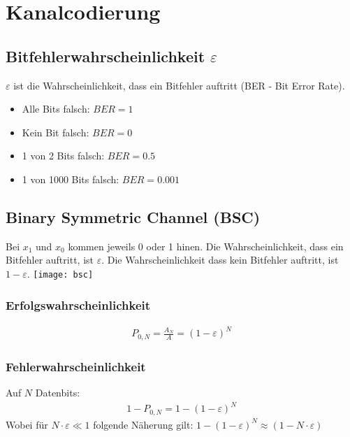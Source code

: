 \section{Kanalcodierung}
\subsection{Bitfehlerwahrscheinlichkeit $\varepsilon$}
$\varepsilon$ ist die Wahrscheinlichkeit, dass ein Bitfehler auftritt (BER - Bit Error Rate).
\begin{itemize}
	\item Alle Bits falsch: $BER = 1$
	\item Kein Bit falsch: $BER = 0$
	\item 1 von 2 Bits falsch: $BER = 0.5$
	\item 1 von 1000 Bits falsch: $BER = 0.001$
\end{itemize}
\subsection{Binary Symmetric Channel (BSC)}
Bei $x_1$ und $x_0$ kommen jeweils 0 oder 1 hinen. Die Wahrscheinlichkeit, dass ein Bitfehler auftritt, ist $\varepsilon$.
Die Wahrscheinlichkeit dass kein Bitfehler auftritt, ist $1 - \varepsilon$.
\texttt{[image: bsc]}
\subsubsection{Erfolgswahrscheinlichkeit}
\begin{align*}
	P_{0,N} = \frac{A_N}{A} = (1 - \varepsilon)^N
\end{align*}
\subsubsection{Fehlerwahrscheinlichkeit}
Auf $N$ Datenbits:
\begin{align*}
	1 - P_{0,N} = 1 - (1 - \varepsilon)^N
\end{align*}
Wobei für $N \cdot \varepsilon \ll 1$ folgende Näherung gilt: $1 - (1 - \varepsilon)^N \approx ( 1 - N \cdot \varepsilon)$
